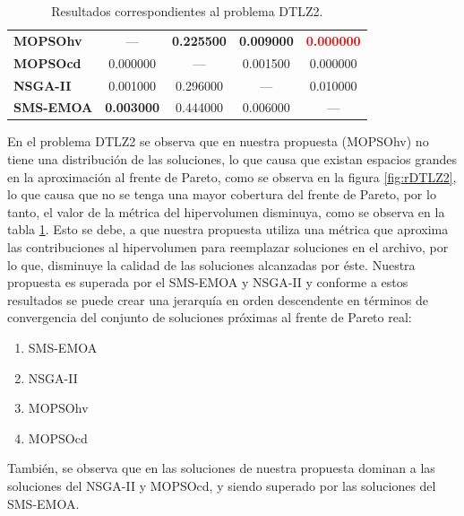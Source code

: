 \begin{table}
\begin{center}
\begin{tabular}{|l|cc|cc|}
	\textbf{MOPSOhv} & ---       & \textbf{0.225500}  &  \textbf{0.009000} &  \textbf{\textcolor{red}{0.000000}} \\ 
	\textbf{MOPSOcd} &  0.000000 & ---       & 0.001500  & 0.000000  \\ 
	\textbf{NSGA-II} & 0.001000  &  0.296000 & ---       & 0.010000 \\  
	\textbf{SMS-EMOA}& \textbf{0.003000}  & 0.444000  &  0.006000 & --- \\  
	\hline
	\end{tabular}
\caption{Resultados correspondientes al problema DTLZ2.}
  \label{tab:dtlz2}
\end{center}
\end{table}

En el problema DTLZ2 se observa que en nuestra propuesta (MOPSOhv) no tiene una distribuci\'on de las soluciones, lo que causa que existan espacios grandes
en la aproximaci\'on al frente de Pareto, como se observa en la figura \ref{fig:rDTLZ2}, lo que causa que no se tenga una mayor cobertura 
del frente de Pareto, por lo tanto, el valor de la m\'etrica del hipervolumen disminuya, como se observa en la tabla \ref{tab:dtlz2}. Esto se 
debe, a que nuestra propuesta utiliza una m\'etrica que aproxima las contribuciones al hipervolumen para reemplazar soluciones en el archivo, 
por lo que, disminuye la calidad de las soluciones alcanzadas por \'este. Nuestra propuesta es superada por el SMS-EMOA y 
NSGA-II y conforme a estos resultados se puede crear una jerarqu\'ia en orden descendente en t\'erminos de convergencia del conjunto de 
soluciones pr\'oximas al frente de Pareto real:


\begin{enumerate}
  \item SMS-EMOA
  \item NSGA-II
  \item MOPSOhv
  \item MOPSOcd
\end{enumerate}

Tambi\'en, se observa que en las soluciones de nuestra propuesta dominan a las soluciones del NSGA-II y MOPSOcd, y siendo superado por las 
soluciones del SMS-EMOA.
\clearpage
\newpage

